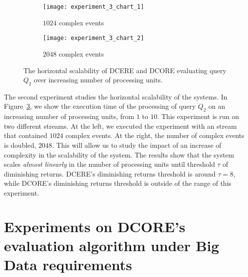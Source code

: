 \begin{figure}[H]
     \begin{adjustbox}{max width=1.3\linewidth,center}
     \centering
     \begin{subfigure}[b]{0.7\textwidth}
         \centering
         \texttt{[image: experiment\_3\_chart\_1]}
         \caption{$1024$ complex events}
         \label{fig:experiment:3:subfigure:1}
     \end{subfigure}
     \begin{subfigure}[b]{0.7\textwidth}
         \centering
         \texttt{[image: experiment\_3\_chart\_2]}
         \caption{$2048$ complex events}
         \label{fig:experiment:3:subfigure:1}
     \end{subfigure}
     \end{adjustbox}
     \caption{The horizontal scalability of DCERE and DCORE evaluating query $Q_{2}$ over increasing number of processing units.}
     \label{fig:experiment:3}
\end{figure}

The second experiment studies the horizontal scalability of the systems. In Figure~\ref{fig:experiment:3}, we show the execution time of the processing of query $Q_{2}$ on an increasing number of processing units, from $1$ to $10$. This experiment is run on two different streams. At the left, we executed the experiment with an stream that contained $1024$ complex events. At the right, the number of complex events is doubled, $2048$. This will allow us to study the impact of an increase of complexity in the scalability of the system. The results show that the system scales \emph{almost linearly} in the number of processing units until threshold $\tau$ of diminishing returns. DCERE's diminishing returns threshold is around $\tau = 8$, while DCORE's diminishing returns threshold is outside of the range of this experiment.

\section{Experiments on DCORE's evaluation algorithm under Big Data requirements}\label{sec:new-algorithm}

